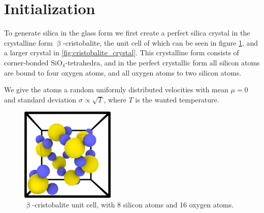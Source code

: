 \section{Initialization\label{sec:experimental_procedure}}
To generate silica in the glass form we first create a perfect silica crystal in the crystalline form $\upbeta$-cristobalite, the unit cell of which can be seen in figure \cref{fig:beta_cristobalite-unit_cell}, and a larger crystal in \cref{fig:cristobalite_crystal}. This crystalline form consists of corner-bonded SiO$_4$-tetrahedra, and in the perfect crystallic form all silicon atoms are bound to four oxygen atoms, and all oxygen atoms to two silicon atoms. 

We give the atoms a random uniformly distributed velocities with mean $\mu = 0$ and standard deviation $\sigma \propto \sqrt{T}$, where $T$ is the wanted temperature.%
\begin{figure}[htb]%
    \centering%
    \includegraphics[width=0.4\textwidth]{images/beta_cristobalite/unit_cell05_cropped.png}%
    \caption{%
        $\upbeta$-cristobalite unit cell, with 8 silicon atoms and 16 oxygen atoms.%
        \label{fig:beta_cristobalite-unit_cell}%
    }%
\end{figure}%

